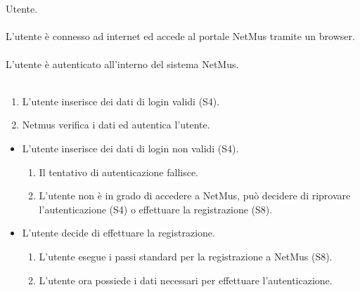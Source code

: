 \vspace{1cm}
\\\\
 Utente. \\\\
 L'utente \`e connesso ad internet ed accede al portale
NetMus tramite un browser. \\\\ 
 L'utente \`e autenticato all'interno del sistema NetMus. \\\\
\begin{enumerate}
  \item L'utente inserisce dei dati di login validi (S4).
  \item Netmus verifica i dati ed autentica l'utente.
\end{enumerate}
\begin{itemize}
  \item L'utente inserisce dei dati di login non validi (S4).
  \begin {enumerate}
    \item Il tentativo di autenticazione fallisce.
    \item L'utente non \`e in grado di accedere a NetMus, pu\`o decidere di
    riprovare l'autenticazione (S4) o effettuare la registrazione (S8).
  \end{enumerate}
  \item L'utente decide di effettuare la registrazione.
  \begin {enumerate}
    \item L'utente esegue i passi standard per la registrazione a NetMus (S8).
    \item L'utente ora possiede i dati necessari per effettuare
    l'autenticazione.
  \end{enumerate}
\end{itemize}
\newpage


